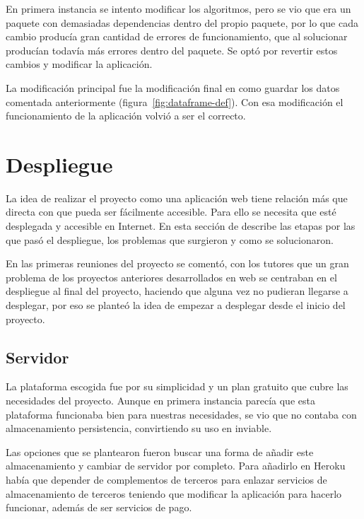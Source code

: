 En primera instancia se intento modificar los algoritmos, pero se vio que era un
paquete con demasiadas dependencias dentro del propio paquete, por lo que cada
cambio producía gran cantidad de errores de funcionamiento, que al solucionar
producían todavía más errores dentro del paquete. Se optó por revertir estos
cambios y modificar la aplicación.

La modificación principal fue la modificación final en como guardar los datos
comentada anteriormente (figura~\ref{fig:dataframe-def}). Con esa modificación
el funcionamiento de la aplicación volvió a ser el correcto.

\section{Despliegue}\label{sec:despliegue}

La idea de realizar el proyecto como una aplicación web tiene relación más que
directa con que pueda ser fácilmente accesible. Para ello se necesita que
esté desplegada y accesible en Internet. En esta sección de describe las etapas
por las que pasó el despliegue, los problemas que surgieron y como se
solucionaron.

En las primeras reuniones del proyecto se comentó, con los tutores que un gran
problema de los proyectos anteriores desarrollados en web se centraban en el
despliegue al final del proyecto, haciendo que alguna vez no pudieran llegarse a
desplegar, por eso se planteó la idea de empezar a desplegar desde el inicio del
proyecto.

\subsection{Servidor}

La plataforma escogida fue 
por su simplicidad y un plan gratuito que cubre las necesidades del proyecto.
Aunque en primera instancia parecía que esta plataforma funcionaba bien para
nuestras necesidades, se vio que no contaba con almacenamiento persistencia,
convirtiendo su uso en inviable.

Las opciones que se plantearon fueron buscar una forma de añadir este
almacenamiento y cambiar de servidor por completo. Para añadirlo en Heroku había
que depender de complementos de terceros para enlazar servicios de
almacenamiento de terceros teniendo que modificar la aplicación para hacerlo
funcionar, además de ser servicios de pago.

